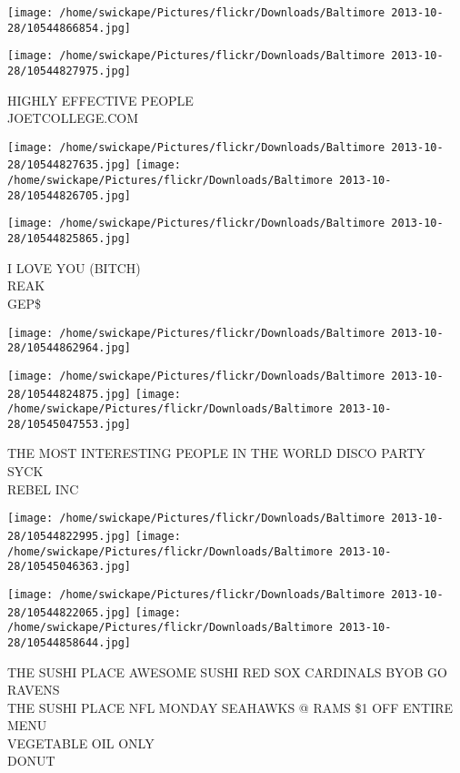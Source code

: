 \documentclass[10pt,letterpaper]{article}
\begin{document}
\texttt{[image: /home/swickape/Pictures/flickr/Downloads/Baltimore 2013-10-28/10544866854.jpg]}

\vspace{0.25in}
\texttt{[image: /home/swickape/Pictures/flickr/Downloads/Baltimore 2013-10-28/10544827975.jpg]}

HIGHLY EFFECTIVE PEOPLE\\
JOETCOLLEGE.COM\\
\pagebreak

\texttt{[image: /home/swickape/Pictures/flickr/Downloads/Baltimore 2013-10-28/10544827635.jpg]}
\texttt{[image: /home/swickape/Pictures/flickr/Downloads/Baltimore 2013-10-28/10544826705.jpg]}

\texttt{[image: /home/swickape/Pictures/flickr/Downloads/Baltimore 2013-10-28/10544825865.jpg]}

I LOVE YOU (BITCH)\\
REAK\\
GEP\$\\
\pagebreak

\texttt{[image: /home/swickape/Pictures/flickr/Downloads/Baltimore 2013-10-28/10544862964.jpg]}

\vspace{0.25in}
\texttt{[image: /home/swickape/Pictures/flickr/Downloads/Baltimore 2013-10-28/10544824875.jpg]}
\texttt{[image: /home/swickape/Pictures/flickr/Downloads/Baltimore 2013-10-28/10545047553.jpg]}

THE MOST INTERESTING PEOPLE IN THE WORLD DISCO PARTY\\
SYCK\\
REBEL INC\\
\pagebreak

\texttt{[image: /home/swickape/Pictures/flickr/Downloads/Baltimore 2013-10-28/10544822995.jpg]}
\texttt{[image: /home/swickape/Pictures/flickr/Downloads/Baltimore 2013-10-28/10545046363.jpg]}

\texttt{[image: /home/swickape/Pictures/flickr/Downloads/Baltimore 2013-10-28/10544822065.jpg]}
\texttt{[image: /home/swickape/Pictures/flickr/Downloads/Baltimore 2013-10-28/10544858644.jpg]}

THE SUSHI PLACE AWESOME SUSHI RED SOX CARDINALS BYOB GO RAVENS\\
THE SUSHI PLACE NFL MONDAY SEAHAWKS @ RAMS \$1 OFF ENTIRE MENU\\
VEGETABLE OIL ONLY\\
DONUT\\
\pagebreak
\end{document}
